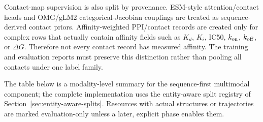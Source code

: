 \documentclass[11pt]{article}
\newcommand{\1}{\mathbf{1}}
\begin{document}
Contact-map supervision is also split by provenance. ESM-style attention/contact heads and OMG/gLM2 categorical-Jacobian couplings are treated as sequence-derived contact priors. Affinity-weighted PPI/contact records are created only for complex rows that actually contain affinity fields such as \(K_d\), \(K_i\), IC50, \(k_{\rm on}\), \(k_{\rm off}\), or \(\Delta G\). Therefore not every contact record has measured affinity. The training and evaluation reports must preserve this distinction rather than pooling all contacts under one label family.

The table below is a modality-level summary for the sequence-first multimodal component; the complete implementation uses the entity-aware split registry of Section~\ref{sec:entity-aware-splits}. Resources with actual structures or trajectories are marked evaluation-only unless a later, explicit phase enables them.
\end{document}
